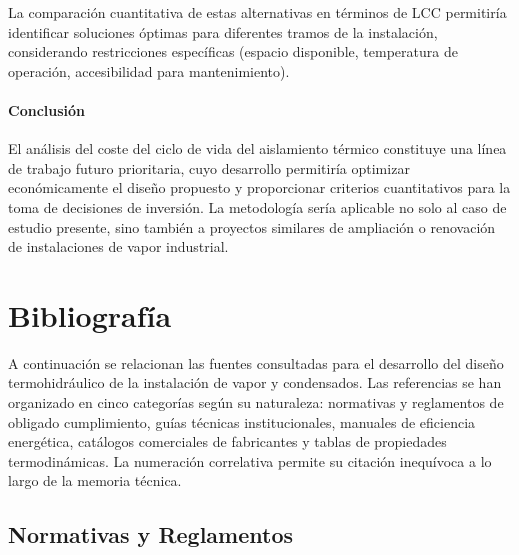 La comparación cuantitativa de estas alternativas en términos de LCC permitiría identificar soluciones óptimas para diferentes tramos de la instalación, considerando restricciones específicas (espacio disponible, temperatura de operación, accesibilidad para mantenimiento).

\paragraph{Conclusión}

El análisis del coste del ciclo de vida del aislamiento térmico constituye una línea de trabajo futuro prioritaria, cuyo desarrollo permitiría optimizar económicamente el diseño propuesto y proporcionar criterios cuantitativos para la toma de decisiones de inversión. La metodología sería aplicable no solo al caso de estudio presente, sino también a proyectos similares de ampliación o renovación de instalaciones de vapor industrial.


\section{Bibliografía}
\label{sec:bibliografia}

A continuación se relacionan las fuentes consultadas para el desarrollo del diseño termohidráulico de la instalación de vapor y condensados. Las referencias se han organizado en cinco categorías según su naturaleza: normativas y reglamentos de obligado cumplimiento, guías técnicas institucionales, manuales de eficiencia energética, catálogos comerciales de fabricantes y tablas de propiedades termodinámicas. La numeración correlativa permite su citación inequívoca a lo largo de la memoria técnica.

\subsection*{Normativas y Reglamentos}

